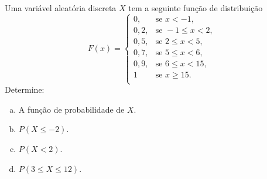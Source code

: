 %
%


\begin{exercicioBanco}[\valorquestao]
Uma variável aleatória discreta \(X\) tem a seguinte função de distribuição
%
\[
    F(x) = \left\{
    \begin{array}{rl}
        0, & \text{se } x < -1, \\
        0,2, & \text{se } -1 \le x < 2, \\
        0,5, & \text{se } 2 \le x < 5, \\
        0,7, & \text{se } 5 \le x < 6, \\
        0,9, & \text{se } 6 \le x < 15, \\
        1 & \text{se } x \ge 15. \\
    \end{array}
    \right.
\]
%
Determine:
\begin{enumerate}[(a)]
    \item A função de probabilidade de \(X\).
    \item \(P(X \le -2)\).
    \item \(P(X < 2)\).
    \item \(P(3 \le X \le 12)\).
\end{enumerate}
%
\end{exercicioBanco}

